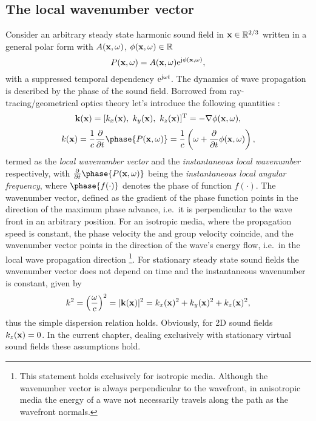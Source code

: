 \subsection{The local wavenumber vector}
Consider an arbitrary steady state harmonic sound field in $\mathbf{x} \in \mathbb{R}^{2/3}$ written in a general polar form with $A(\mathbf{x},\omega)$, $\phi(\mathbf{x},\omega) \in \mathbb{R}$
\begin{equation}
P(\mathbf{x},\omega) = A(\mathbf{x},\omega)\mathrm{e}^{\mathrm{j} \phi(\mathbf{x},\omega)},
\label{eq:25D_WFS:general_sf}
\end{equation}
with a suppressed temporal dependency $\mathrm{e}^{\mathrm{j} \omega t}$.
The dynamics of wave propagation is described by the phase of the sound field.
Borrowed from ray-tracing/geometrical optics theory let's introduce the following quantities \cite{Romer2005,Carozzi2004}:
\begin{equation}
\vk(\vx) = [k_x(\vx),\ k_y(\vx),\ k_z(\vx)]^{\mathrm{T}} = -\nabla \phi(\vx,\omega),
\end{equation}
\begin{equation}
k(\vx) =  \frac{1}{c} \frac{\partial}{\partial t} \phase{P(\vx,\omega)}  = \frac{1}{c} \left( \omega + \frac{\partial}{\partial t} \phi(\vx,\omega) \right),
\end{equation}
termed as the \emph{local wavenumber vector} and the \emph{instantaneous local wavenumber} respectively, with $ \frac{\partial}{\partial t} \phase{P(\vx,\omega)} $ being the \emph{instantaneous local angular frequency}, where $\phase{f(\cdot)}$ denotes the phase of function $f(\cdot)$.
The wavenumber vector, defined as the gradient of the phase function points in the direction of the maximum phase advance, i.e.\ it is perpendicular to the wave front in an arbitrary position.
For an isotropic media, where the propagation speed is constant, the phase velocity the and group velocity coincide, and the wavenumber vector points in the direction of the wave's energy flow, i.e.\ in the local wave propagation direction \footnote{This statement holds exclusively for isotropic media.
Although the wavenumber vector is always perpendicular to the wavefront, in anisotropic media the energy of a wave not necessarily travels along the path as the wavefront normals\cite{Pollard1977}.}.
For stationary steady state sound fields the wavenumber vector does not depend on time and the instantaneous wavenumber is constant, given by 
\begin{equation}
k^2 = \left( \frac{\omega}{c} \right)^2 = |\mathbf{k}(\mathbf{x})|^2 = k_x(\mathbf{x})^2 + k_y(\mathbf{x})^2 + k_z(\mathbf{x})^2,
\end{equation}
thus the simple dispersion relation holds.
Obviously, for 2D sound fields $k_z(\mathbf{x})=0$.
In the current chapter, dealing exclusively with stationary virtual sound fields these assumptions hold.

